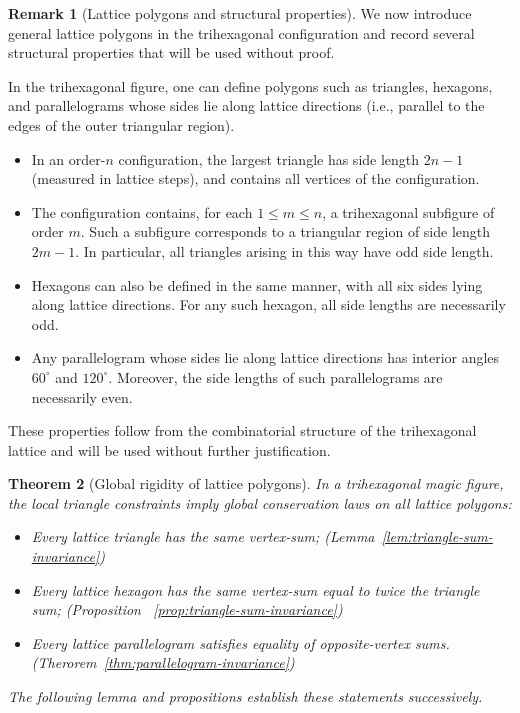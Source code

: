 \documentclass[11pt]{article}
\theoremstyle{plain}
\newtheorem{theorem}{Theorem}[section]
\theoremstyle{definition}
\newtheorem{remark}[theorem]{Remark}
\begin{document}
\begin{remark}[Lattice polygons and structural properties]
We now introduce general lattice polygons in the trihexagonal configuration and record several structural properties that will be used without proof.

In the trihexagonal figure, one can define polygons such as triangles, hexagons, and parallelograms whose sides lie along lattice directions (i.e., parallel to the edges of the outer triangular region).

\begin{itemize}
    \item[(1)] In an order-$n$ configuration, the largest triangle has side length $2n-1$ (measured in lattice steps), and contains all vertices of the configuration.

    \item[(2)] The configuration contains, for each $1 \le m \le n$, a trihexagonal subfigure of order $m$. 
    Such a subfigure corresponds to a triangular region of side length $2m-1$. 
    In particular, all triangles arising in this way have odd side length.

    \item[(3)] Hexagons can also be defined in the same manner, with all six sides lying along lattice directions. 
    For any such hexagon, all side lengths are necessarily odd.

    \item[(4)] Any parallelogram whose sides lie along lattice directions has interior angles $60^\circ$ and $120^\circ$. 
    Moreover, the side lengths of such parallelograms are necessarily even.
\end{itemize}

These properties follow from the combinatorial structure of the trihexagonal lattice and will be used without further justification.
\end{remark}

\begin{theorem}[Global rigidity of lattice polygons]
In a trihexagonal magic figure, the local triangle constraints imply global conservation laws on all lattice polygons:
\begin{itemize}
    \item Every lattice triangle has the same vertex-sum; (Lemma~\ref{lem:triangle-sum-invariance})
    \item Every lattice hexagon has the same vertex-sum equal to twice the triangle sum; (Proposition ~\ref{prop:triangle-sum-invariance})
    \item Every lattice parallelogram satisfies equality of opposite-vertex sums. (Therorem~\ref{thm:parallelogram-invariance})
\end{itemize}
The following lemma and propositions establish these statements successively.
\end{theorem}
\end{document}
